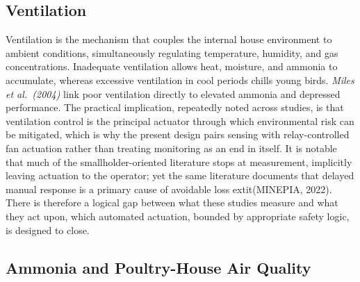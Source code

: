 \documentclass[12pt,a4paper]{report}
\begin{document}
\subsection{Ventilation}

Ventilation is the mechanism that couples the internal house environment to ambient conditions, simultaneously regulating temperature, humidity, and gas concentrations. Inadequate ventilation allows heat, moisture, and ammonia to accumulate, whereas excessive ventilation in cool periods chills young birds. \textit{Miles et al.\ (2004)} link poor ventilation directly to elevated ammonia and depressed performance. The practical implication, repeatedly noted across studies, is that ventilation control is the principal actuator through which environmental risk can be mitigated, which is why the present design pairs sensing with relay-controlled fan actuation rather than treating monitoring as an end in itself. It is notable that much of the smallholder-oriented literature stops at measurement, implicitly leaving actuation to the operator; yet the same literature documents that delayed manual response is a primary cause of avoidable loss 	extit{(MINEPIA, 2022)}. There is therefore a logical gap between what these studies measure and what they act upon, which automated actuation, bounded by appropriate safety logic, is designed to close.

\subsection{Ammonia and Poultry-House Air Quality}
\end{document}
